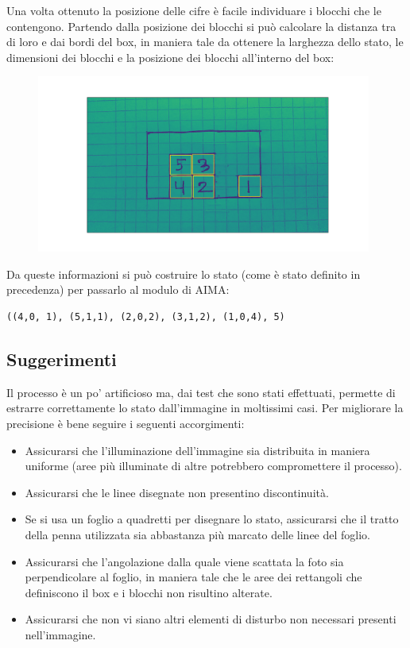 \documentclass{article}
\begin{document}
	
	\noindent Una volta ottenuto la posizione delle cifre è facile individuare i blocchi che le contengono. Partendo dalla posizione dei blocchi si può calcolare la distanza tra di loro e dai bordi del box, in maniera tale da ottenere la larghezza dello stato, le dimensioni dei blocchi e la posizione dei blocchi all'interno del box:
	
	
	\begin{figure}[H]
		\centering
		\includegraphics[width=11cm]{./images/immagine_test_digits.png}
	\end{figure}

	\noindent Da queste informazioni si può costruire lo stato (come è stato definito in precedenza) per passarlo al modulo di AIMA:
	
	\begin{verbatim}
((4,0, 1), (5,1,1), (2,0,2), (3,1,2), (1,0,4), 5)
	\end{verbatim}
	
	\subsection{Suggerimenti}
	Il processo è un po' artificioso ma, dai test che sono stati effettuati, permette di estrarre correttamente lo stato dall'immagine in moltissimi casi. Per migliorare la precisione è bene seguire i seguenti accorgimenti:
	\begin{itemize}
		\item Assicurarsi che l'illuminazione dell'immagine sia distribuita in maniera uniforme (aree più illuminate di altre potrebbero compromettere il processo).
		\item Assicurarsi che le linee disegnate non presentino discontinuità.
		\item Se si usa un foglio a quadretti per disegnare lo stato, assicurarsi che il tratto della penna utilizzata sia abbastanza più marcato delle linee del foglio.
		\item Assicurarsi che l'angolazione dalla quale viene scattata la foto sia perpendicolare al foglio, in maniera tale che le aree dei rettangoli che definiscono il box e i blocchi non risultino alterate.
		\item Assicurarsi che non vi siano altri elementi di disturbo non necessari presenti nell'immagine.
	\end{itemize}
\end{document}
